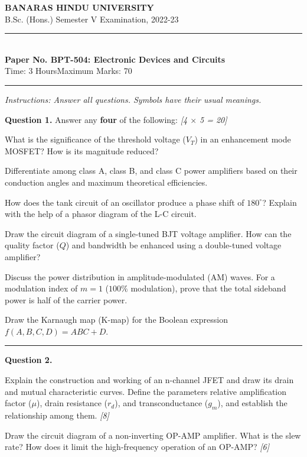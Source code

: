\documentclass[11pt,a4paper]{article}
\newcommand{\pts}[1]{\hfill   \textit{[#1]}}
\begin{document}
\begin{center}
  {\large\bfseries BANARAS HINDU UNIVERSITY}\\[2pt]
  {\normalsize B.Sc. (Hons.) Semester V Examination, 2022-23}\\[6pt]
  \rule{0.8\linewidth}{0.5pt}\\[6pt]
  {\large\bfseries Paper No. BPT-504: Electronic Devices and Circuits}\\[4pt]
  {\normalsize Time: 3 Hours\hfill Maximum Marks: 70}
\end{center}
\rule{\linewidth}{0.4pt}
\smallskip



\noindent   \textit{Instructions: Answer all questions. Symbols have their usual meanings.}
\bigskip




\noindent   \textbf{Question 1.} Answer any   \textbf{four} of the following: \pts{4 $ \times$ 5 = 20}

\begin{parts}
  \item What is the significance of the threshold voltage ($V_T$) in an enhancement mode MOSFET? How is its magnitude reduced?
  \item Differentiate among class A, class B, and class C power amplifiers based on their conduction angles and maximum theoretical efficiencies.
  \item How does the tank circuit of an oscillator produce a phase shift of $180^\circ$? Explain with the help of a phasor diagram of the L-C circuit.
  \item Draw the circuit diagram of a single-tuned BJT voltage amplifier. How can the quality factor ($Q$) and bandwidth be enhanced using a double-tuned voltage amplifier?
  \item Discuss the power distribution in amplitude-modulated (AM) waves. For a modulation index of $m = 1$ ($100\%$ modulation), prove that the total sideband power is half of the carrier power.
  \item Draw the Karnaugh map (K-map) for the Boolean expression $f(A, B, C, D) = ABC + D$.
\end{parts}

\medskip\rule{\linewidth}{0.2pt}




\noindent   \textbf{Question 2.}

\begin{parts}
  \item Explain the construction and working of an n-channel JFET and draw its drain and mutual characteristic curves. Define the parameters relative amplification factor ($\mu$), drain resistance ($r_d$), and transconductance ($g_m$), and establish the relationship among them. \pts{8}
  \item Draw the circuit diagram of a non-inverting OP-AMP amplifier. What is the slew rate? How does it limit the high-frequency operation of an OP-AMP? \pts{6}
\end{parts}
\end{document}
